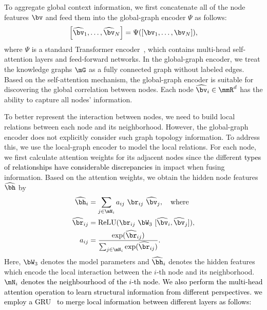 \documentclass[letterpaper]{article}
\def\hmg{\textcolor{black}}
\begin{document}
To aggregate global context information, we first concatenate all of the node features $\bv$ and feed them into the global-graph encoder $\Psi$ as follows:
\begin{equation}
    \begin{aligned}
    \label{global_encoder}
    \left [ \widehat{\bv}_1,\dots, \widehat{\bv}_N \right ] = \Psi ([\bv_1,\dots, \bv_N]),
    \end{aligned}
\end{equation}
where $\Psi$ is a standard Transformer encoder~\cite{Vaswani2017AttentionIA}, which contains multi-head self-attention layers and feed-forward networks. In the global-graph encoder, we treat the knowledge graphs $\mG$ as a fully connected graph without labeled edges. Based on the self-attention mechanism, the global-graph encoder is suitable for discovering the global correlation between nodes. Each node $\widehat{\bv}_i \in \mmR^{d}$ has the ability to capture all nodes' information.

To better represent the interaction between nodes, we need to build local relations between each node and its neighborhood. However, the global-graph encoder does not explicitly consider such graph topology information. To address this, we use the local-graph encoder to model the local relations. 
For each node, we first calculate attention weights for its adjacent nodes since the different 
\hmg{types of relationships have considerable discrepancies }
in impact when fusing information. Based on the attention weights, we obtain the hidden node features $\widehat{\bh}$ by
\begin{equation}
    \begin{aligned}
  \widehat{\bh}_i &= \sum_{j \in \mN_i} a_{ij} \ \br_{ij} \ \widehat{\bv}_j, ~~~\mathrm{where}\\
     \widehat{\br}_{ij} &= \mathrm{ReLU} (\br_{ij} \ \bW_3 \ [\widehat{\bv}_{i}, \widehat{\bv}_{j}]),\\
    a_{ij} &=  \frac{\exp (\widehat{\br}_{ij})}{\sum_{j \in \mN_i}  \exp (\widehat{\br}_{ij}) }.
    \end{aligned}
\end{equation}
Here, $\bW_3$ denotes the model parameters and  $\widehat{\bh}_i$ denotes the hidden features which encode the local interaction between the $i$-th node and its neighborhood.
\hmg{$\mN_i$ denotes the neighbourhood of the $i$-th node.
We also perform the multi-head attention operation to learn structural information from different perspectives.}
\hmg{we employ a GRU~\cite{Cho2014LearningPR} to merge local information between different layers as follows:}
\end{document}
